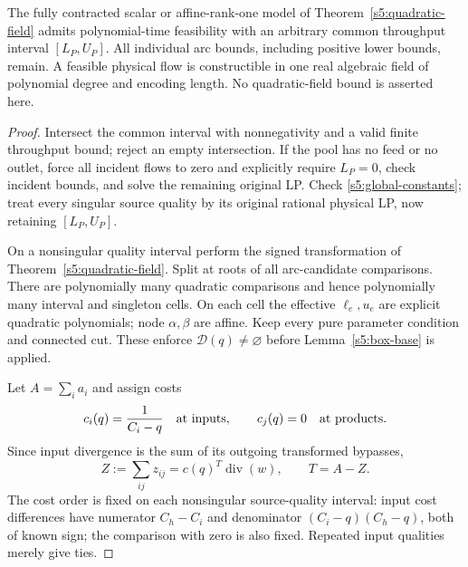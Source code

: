 \begin{theorem}
\label{s5:restrictive-capacity}
The fully contracted scalar or affine-rank-one model of
Theorem~\ref{s5:quadratic-field} admits polynomial-time feasibility with
an arbitrary common throughput interval $[L_P,U_P]$. All individual
arc bounds, including positive lower bounds, remain. A feasible physical
flow is constructible in one real algebraic field of polynomial degree
and encoding length. No quadratic-field bound is asserted here.
\end{theorem}
\begin{proof}
Intersect the common interval with nonnegativity and a valid finite
throughput bound; reject an empty intersection. If the pool has no feed
or no outlet, force all incident flows to zero and explicitly require
$L_P=0$, check incident bounds, and solve the remaining original LP.
Check \eqref{s5:global-constants}; treat every singular source quality
by its original rational physical LP, now retaining $[L_P,U_P]$.

On a nonsingular quality interval perform the signed transformation
of Theorem~\ref{s5:quadratic-field}. Split at roots of all arc-candidate
comparisons. There are polynomially many quadratic comparisons and
hence polynomially many interval and singleton cells. On each cell the
effective $\ell_e,u_e$ are explicit quadratic polynomials; node
$\alpha,\beta$ are affine. Keep every pure parameter condition and
connected cut. These enforce $\mathcal D(q)\ne\varnothing$ before
Lemma~\ref{s5:box-base} is applied.

Let $A=\sum_i a_i$ and assign costs
\[
 c_i(q)=\frac1{C_i-q}\quad\hbox{at inputs},\qquad
 c_j(q)=0\quad\hbox{at products}.
\]
Since input divergence is the sum of its outgoing transformed bypasses,
\begin{equation}
 Z:=\sum_{ij}z_{ij}=c(q)^T\operatorname{div}(w),\qquad T=A-Z.
 \label{s5:throughput-support}
\end{equation}
The cost order is fixed on each nonsingular source-quality interval:
input cost differences have numerator $C_h-C_i$ and denominator
$(C_i-q)(C_h-q)$, both of known sign; the comparison with zero is
also fixed. Repeated input qualities merely give ties.


\end{proof}
